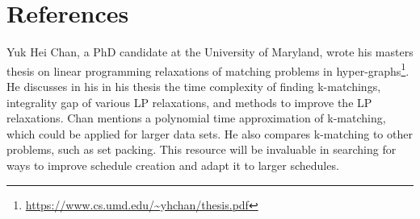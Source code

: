 \documentclass[11pt]{article}
\begin{document}
\section{References}
Yuk Hei Chan, a PhD candidate at the University of Maryland, wrote his masters thesis on linear programming relaxations of matching problems in hyper-graphs\footnote{\url{https://www.cs.umd.edu/~yhchan/thesis.pdf}}. He discusses in his in his thesis the time complexity of finding k-matchings, integrality gap of various LP relaxations, and methods to improve the LP relaxations. Chan mentions a polynomial time approximation of k-matching, which could be applied for larger data sets. He also compares k-matching to other problems, such as set packing. This resource will be invaluable in searching for ways to improve schedule creation and adapt it to larger schedules.
\end{document}
